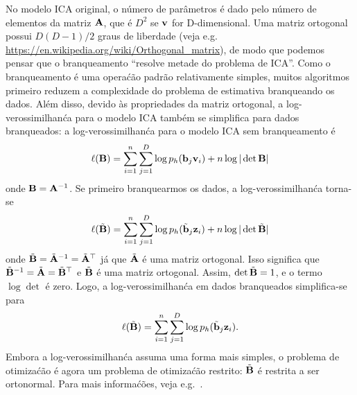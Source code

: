 \begin{exenumerate}
\begin{solution}
        No modelo ICA original, o n\'umero de par\^ametros \'e dado pelo
        n\'umero de elementos da matriz $\mathbf{A}$, que \'e $D^2$ se $\mathbf{v}$ for
        D-dimensional. Uma matriz ortogonal possui $D(D-1)/2$ graus de
        liberdade {\small (veja
            e.g. \url{https://en.wikipedia.org/wiki/Orthogonal_matrix}}), de
        modo que podemos pensar que o branqueamento ``resolve metade do problema de ICA''. Como o branqueamento \'e uma opera\'c\~ao padr\~ao relativamente simples, muitos algoritmos \citep[e.g.\ ``fastICA'',][]{Hyvarinen1999}
        primeiro reduzem a complexidade do problema de estimativa branqueando os
        dados. Al\'em disso, devido \`as propriedades da matriz ortogonal,
        a log-verossimilhan\'ca para o modelo ICA tamb\'em se simplifica para
        dados branqueados: a log-verossimilhan\'ca para o modelo ICA sem branqueamento \'e
        \begin{equation}
            \ell(\mathbf{B}) = \sum_{i=1}^n  \sum_{j=1}^D\log p_h (\mathbf{b}_j \mathbf{v}_i) + n \log |\det \mathbf{B}|
        \end{equation}
        onde $\mathbf{B} = \mathbf{A}^{-1}$. Se primeiro branquearmos os dados, a log-verossimilhan\'ca torna-se
        \begin{equation}
            \ell(\tilde{\mathbf{B}}) = \sum_{i=1}^n  \sum_{j=1}^D\log p_h (\tilde{\mathbf{b}}_j \mathbf{z}_i) + n \log |\det \tilde{\mathbf{B}}|
        \end{equation}
        onde $\tilde{\mathbf{B}} = \tilde{\mathbf{A}}^{-1} = \tilde{\mathbf{A}}^\top$ j\'a que $\tilde{\mathbf{A}}$ \'e
        uma matriz ortogonal. Isso significa que $\tilde{\mathbf{B}}^{-1} = \tilde{\mathbf{A}} =
        \tilde{\mathbf{B}}^\top$ e $\tilde{\mathbf{B}}$ \'e uma matriz ortogonal. Assim,
        $\det \tilde{\mathbf{B}}=1$, e o termo $\log \det$ \'e zero. Logo, a
        log-verossimilhan\'ca em dados branqueados simplifica-se para
        \begin{equation}
            \ell(\tilde{\mathbf{B}}) = \sum_{i=1}^n  \sum_{j=1}^D\log p_h (\tilde{\mathbf{b}}_j \mathbf{z}_i).
        \end{equation}
        Embora a log-verossimilhan\'ca assuma uma forma mais simples, o problema de otimiza\'c\~ao \'e agora um problema de otimiza\'c\~ao restrito: $\tilde{\mathbf{B}}$ \'e
        restrita a ser ortonormal. Para mais informa\'c\~oes, veja
        e.g.\ \citep[Cap\'itulo 9]{Hyvarinen2001}.  
        
    \end{solution}
    
\end{exenumerate}



